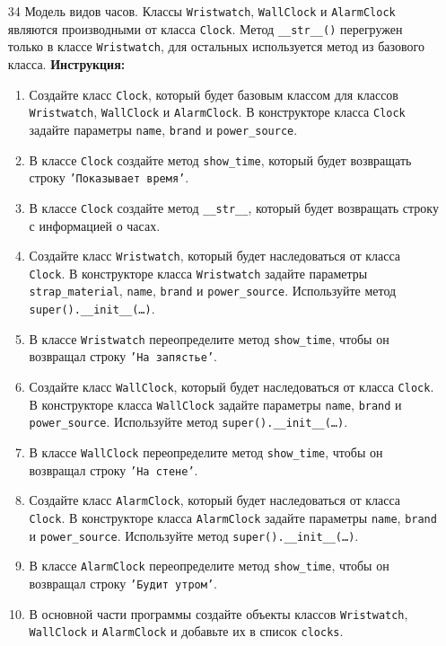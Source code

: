 \begin{enumerate}
\begin{enumerate}
\end{enumerate}
\item[34]
Модель видов часов. Классы \texttt{Wristwatch}, \texttt{WallClock} и \texttt{AlarmClock} являются производными от класса \texttt{Clock}. Метод \texttt{\_\_str\_\_()} перегружен только в классе \texttt{Wristwatch}, для остальных используется метод из базового класса.
\textbf{Инструкция:}
\begin{enumerate}
    \item Создайте класс \texttt{Clock}, который будет базовым классом для классов \texttt{Wristwatch}, \texttt{WallClock} и \texttt{AlarmClock}. В конструкторе класса \texttt{Clock} задайте параметры \texttt{name}, \texttt{brand} и \texttt{power\_source}.
    \item В классе \texttt{Clock} создайте метод \texttt{show\_time}, который будет возвращать строку \texttt{'Показывает время'}.
    \item В классе \texttt{Clock} создайте метод \texttt{\_\_str\_\_}, который будет возвращать строку с информацией о часах.
    \item Создайте класс \texttt{Wristwatch}, который будет наследоваться от класса \texttt{Clock}. В конструкторе класса \texttt{Wristwatch} задайте параметры \texttt{strap\_material}, \texttt{name}, \texttt{brand} и \texttt{power\_source}. Используйте метод \texttt{super().\_\_init\_\_(\ldots)}.
    \item В классе \texttt{Wristwatch} переопределите метод \texttt{show\_time}, чтобы он возвращал строку \texttt{'На запястье'}.
    \item Создайте класс \texttt{WallClock}, который будет наследоваться от класса \texttt{Clock}. В конструкторе класса \texttt{WallClock} задайте параметры \texttt{name}, \texttt{brand} и \texttt{power\_source}. Используйте метод \texttt{super().\_\_init\_\_(\ldots)}.
    \item В классе \texttt{WallClock} переопределите метод \texttt{show\_time}, чтобы он возвращал строку \texttt{'На стене'}.
    \item Создайте класс \texttt{AlarmClock}, который будет наследоваться от класса \texttt{Clock}. В конструкторе класса \texttt{AlarmClock} задайте параметры \texttt{name}, \texttt{brand} и \texttt{power\_source}. Используйте метод \texttt{super().\_\_init\_\_(\ldots)}.
    \item В классе \texttt{AlarmClock} переопределите метод \texttt{show\_time}, чтобы он возвращал строку \texttt{'Будит утром'}.
    \item В основной части программы создайте объекты классов \texttt{Wristwatch}, \texttt{WallClock} и \texttt{AlarmClock} и добавьте их в список \texttt{clocks}.

\end{enumerate}
\end{enumerate}
